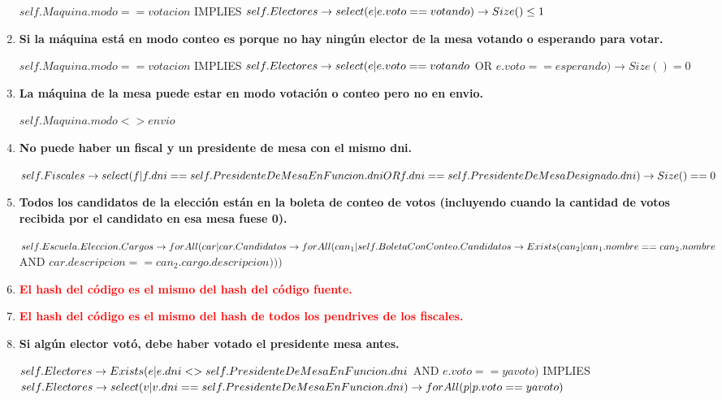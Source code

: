\begin{enumerate}
$self.Maquina.modo == votacion$  IMPLIES  $ \\
self.Electores \rightarrow select(e | e.voto == votando) \rightarrow Size() \leq 1$

\item \textbf{Si la máquina está en modo conteo es porque no hay ningún elector de la mesa votando o esperando para votar.}

$self.Maquina.modo == votacion$  IMPLIES  $ \\
self.Electores \rightarrow \\
select(e | e.voto == votando$ OR $e.voto == esperando) \rightarrow Size() = 0$

\item \textbf{La máquina de la mesa puede estar en modo votación o conteo pero no en envio.}

$self.Maquina.modo <> envio$

\item \textbf{No puede haber un fiscal y un presidente de mesa con el mismo dni.}

$self.Fiscales \rightarrow \\
select(f | f.dni == self.PresidenteDeMesaEnFuncion.dni OR \\
f.dni == self.PresidenteDeMesaDesignado.dni) \rightarrow \\
Size() == 0 $

\item \textbf{Todos los candidatos de la elecci\'on est\'an en la boleta de conteo de votos (incluyendo cuando la cantidad de votos recibida por el candidato en esa mesa fuese 0).}

$self.Escuela.Eleccion.Cargos \rightarrow \\
forAll(car | car.Candidatos \rightarrow \\
forAll(can_1 | self.BoletaConConteo.Candidatos \rightarrow \\
Exists(can_2| can_1.nombre == can_2.nombre $ AND $car.descripcion==can_2.cargo.descripcion)))$

\item \textbf{\textcolor{red}{El hash del código es el mismo del hash del código fuente. }  }
\item \textbf{\textcolor{red}{El hash del código es el mismo del hash de todos los pendrives de los fiscales.}}


\item \textbf{Si alg\'un elector vot\'o, debe haber votado el presidente mesa antes.}

$self.Electores \rightarrow \\
Exists (e | e.dni <> self.PresidenteDeMesaEnFuncion.dni $ AND $e.voto==yavoto)$ IMPLIES $\\
self.Electores \rightarrow select(v | v.dni==self.PresidenteDeMesaEnFuncion.dni) \rightarrow \\
forAll(p | p.voto==yavoto)$

\end{enumerate}

